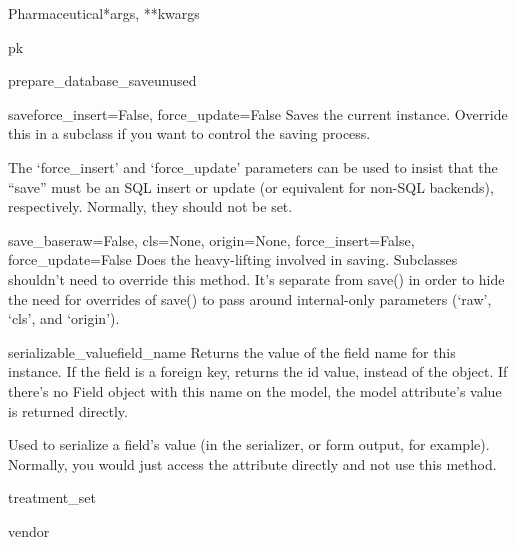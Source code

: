 \documentclass[letterpaper,10pt,english]{sphinxmanual}
\begin{document}
\begin{classdesc}{Pharmaceutical}{*args, **kwargs}
\hypertarget{data.models.Pharmaceutical.pk}{}\begin{memberdesc}[Pharmaceutical]{pk}\end{memberdesc}

\hypertarget{data.models.Pharmaceutical.prepare_database_save}{}\begin{methoddesc}[Pharmaceutical]{prepare\_database\_save}{unused}\end{methoddesc}

\hypertarget{data.models.Pharmaceutical.save}{}\begin{methoddesc}[Pharmaceutical]{save}{force\_insert=False, force\_update=False}
Saves the current instance. Override this in a subclass if you want to
control the saving process.

The `force\_insert' and `force\_update' parameters can be used to insist
that the ``save'' must be an SQL insert or update (or equivalent for
non-SQL backends), respectively. Normally, they should not be set.
\end{methoddesc}

\hypertarget{data.models.Pharmaceutical.save_base}{}\begin{methoddesc}[Pharmaceutical]{save\_base}{raw=False, cls=None, origin=None, force\_insert=False, force\_update=False}
Does the heavy-lifting involved in saving. Subclasses shouldn't need to
override this method. It's separate from save() in order to hide the
need for overrides of save() to pass around internal-only parameters
(`raw', `cls', and `origin').
\end{methoddesc}

\hypertarget{data.models.Pharmaceutical.serializable_value}{}\begin{methoddesc}[Pharmaceutical]{serializable\_value}{field\_name}
Returns the value of the field name for this instance. If the field is
a foreign key, returns the id value, instead of the object. If there's
no Field object with this name on the model, the model attribute's
value is returned directly.

Used to serialize a field's value (in the serializer, or form output,
for example). Normally, you would just access the attribute directly
and not use this method.
\end{methoddesc}

\hypertarget{data.models.Pharmaceutical.treatment_set}{}\begin{memberdesc}[Pharmaceutical]{treatment\_set}\end{memberdesc}

\hypertarget{data.models.Pharmaceutical.vendor}{}\begin{memberdesc}[Pharmaceutical]{vendor}\end{memberdesc}
\end{classdesc}
\end{document}
